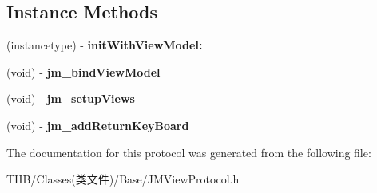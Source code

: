 \subsection*{Instance Methods}
\begin{DoxyCompactItemize}
\item 
\mbox{\label{protocol_j_m_view_protocol_01-p_af1a5c080e5ff5a8245aa9bca83971018}} 
(instancetype) -\/ {\bfseries init\+With\+View\+Model\+:}
\item 
\mbox{\label{protocol_j_m_view_protocol_01-p_a3baff3f979fa396232ce5bf066aa9766}} 
(void) -\/ {\bfseries jm\+\_\+bind\+View\+Model}
\item 
\mbox{\label{protocol_j_m_view_protocol_01-p_ade11cde7e969f983e2b231eeaedb263c}} 
(void) -\/ {\bfseries jm\+\_\+setup\+Views}
\item 
\mbox{\label{protocol_j_m_view_protocol_01-p_a741f11dfaccadfbe015c12a077e8017a}} 
(void) -\/ {\bfseries jm\+\_\+add\+Return\+Key\+Board}
\end{DoxyCompactItemize}


The documentation for this protocol was generated from the following file\+:\begin{DoxyCompactItemize}
\item 
T\+H\+B/\+Classes(类文件)/\+Base/J\+M\+View\+Protocol.\+h\end{DoxyCompactItemize}
